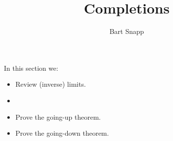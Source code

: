 \documentclass{ximera}
\author{Bart Snapp}
\title{Completions}
\begin{document}
\begin{abstract}
\end{abstract}
\maketitle
In this section we:

\begin{itemize}
\item Review (inverse) limits.
\item 
\item Prove the going-up theorem.
\item Prove the going-down theorem.
\end{itemize}
\end{document}
